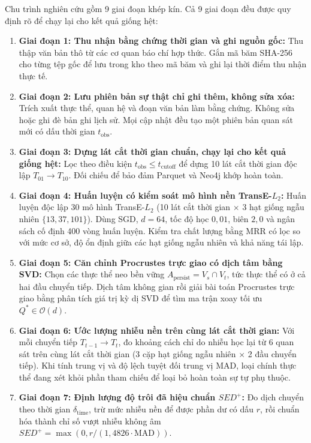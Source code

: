 Chu trình nghiên cứu gồm 9 giai đoạn khép kín. Cả 9 giai đoạn đều được quy định rõ để chạy lại cho kết quả giống hệt:

\begin{enumerate}
    \item \textbf{Giai đoạn 1: Thu nhận bằng chứng thời gian và ghi nguồn gốc:} Thu thập văn bản thô từ các cơ quan báo chí hợp thức. Gắn mã băm SHA-256 cho từng tệp gốc để lưu trong kho theo mã băm và ghi lại thời điểm thu nhận thực tế.
    \item \textbf{Giai đoạn 2: Lưu phiên bản sự thật chỉ ghi thêm, không sửa xóa:} Trích xuất thực thể, quan hệ và đoạn văn bản làm bằng chứng. Không sửa hoặc ghi đè bản ghi lịch sử. Mọi cập nhật đều tạo một phiên bản quan sát mới có dấu thời gian $t_{\text{obs}}$.
    \item \textbf{Giai đoạn 3: Dựng lát cắt thời gian chuẩn, chạy lại cho kết quả giống hệt:} Lọc theo điều kiện $t_{\text{obs}} \le t_{\text{cutoff}}$ để dựng 10 lát cắt thời gian độc lập $T_{01} \to T_{10}$. Đối chiếu để bảo đảm Parquet và Neo4j khớp hoàn toàn.
    \item \textbf{Giai đoạn 4: Huấn luyện có kiểm soát mô hình nền TransE-$L_2$:} Huấn luyện độc lập 30 mô hình TransE-$L_2$ (10 lát cắt thời gian $\times$ 3 hạt giống ngẫu nhiên $\{13, 37, 101\}$). Dùng SGD, $d=64$, tốc độ học $0{,}01$, biên $2{,}0$ và ngân sách cố định 400 vòng huấn luyện. Kiểm tra chất lượng bằng MRR có lọc so với mức cơ sở, độ ổn định giữa các hạt giống ngẫu nhiên và khả năng tái lập.
    \item \textbf{Giai đoạn 5: Căn chỉnh Procrustes trực giao có dịch tâm bằng SVD:} Chọn các thực thể neo bền vững $A_{\text{persist}} = V_s \cap V_t$, tức thực thể có ở cả hai đầu chuyển tiếp. Dịch tâm không gian rồi giải bài toán Procrustes trực giao bằng phân tích giá trị kỳ dị SVD để tìm ma trận xoay tối ưu $Q^* \in \mathcal{O}(d)$.
    \item \textbf{Giai đoạn 6: Ước lượng nhiễu nền trên cùng lát cắt thời gian:} Với mỗi chuyển tiếp $T_{t-1} \to T_t$, đo khoảng cách chỉ do nhiễu học lại từ 6 quan sát trên cùng lát cắt thời gian (3 cặp hạt giống ngẫu nhiên $\times$ 2 đầu chuyển tiếp). Khi tính trung vị và độ lệch tuyệt đối trung vị MAD, loại chính thực thể đang xét khỏi phần tham chiếu để loại bỏ hoàn toàn sự tự phụ thuộc.
    \item \textbf{Giai đoạn 7: Định lượng độ trôi đã hiệu chuẩn $SED^+$:} Đo dịch chuyển theo thời gian $\delta_{\text{time}}$, trừ mức nhiễu nền để được phần dư có dấu $r$, rồi chuẩn hóa thành chỉ số vượt nhiễu không âm $SED^+ = \max(0, r / (1{,}4826 \cdot \text{MAD}))$.

\end{enumerate}
